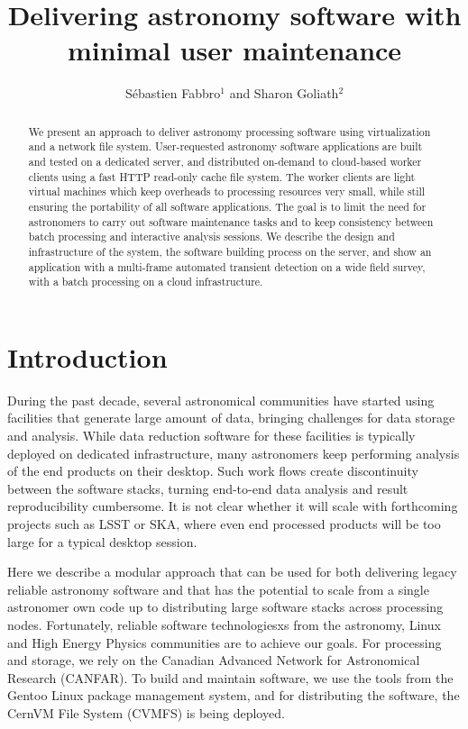 \documentclass[11pt,twoside]{article}
\begin{document}
\title{Delivering astronomy software with minimal user maintenance}

\author{S\'ebastien Fabbro$^1$ and Sharon Goliath$^2$
}

\begin{abstract}
  We present an approach to deliver astronomy processing software using
  virtualization and a network file system. User-requested astronomy
  software applications are built and tested on a dedicated server, and
  distributed on-demand to cloud-based worker clients using a fast HTTP
  read-only cache file system. The worker clients are light virtual
  machines which keep overheads to processing resources very small,
  while still ensuring the portability of all software applications. The
  goal is to limit the need for astronomers to carry out software
  maintenance tasks and to keep consistency between batch processing
  and interactive analysis sessions. We describe the design and
  infrastructure of the system, the software building process on the
  server, and show an application with a multi-frame automated
  transient detection on a wide field survey, with a batch processing
  on a cloud infrastructure.
\end{abstract}

\section{Introduction}
During the past decade, several astronomical communities have started using
facilities that generate large amount of data, bringing challenges for
data storage and analysis. While data reduction
software for these facilities is typically deployed on dedicated
infrastructure, many astronomers keep performing analysis of the 
end products on their desktop. Such work flows create discontinuity between the
software stacks, turning end-to-end data analysis and result
reproducibility cumbersome. It is not clear whether it will scale
with forthcoming projects such as LSST or SKA, where even end
processed products will be too large for a typical desktop session.

Here we describe a modular approach that can be used for both
delivering legacy reliable astronomy software and that has the potential
to scale from a single astronomer own code up to distributing large
software stacks across processing nodes. Fortunately, reliable
software technologiesxs from the astronomy,
Linux and High Energy Physics communities are to achieve our goals. For
processing and storage, we rely on the Canadian Advanced Network for
Astronomical Research (CANFAR). To build and maintain software, we use the tools
from the Gentoo Linux package management system, and for distributing the
software, the CernVM File System (CVMFS) is being deployed.
\end{document}
